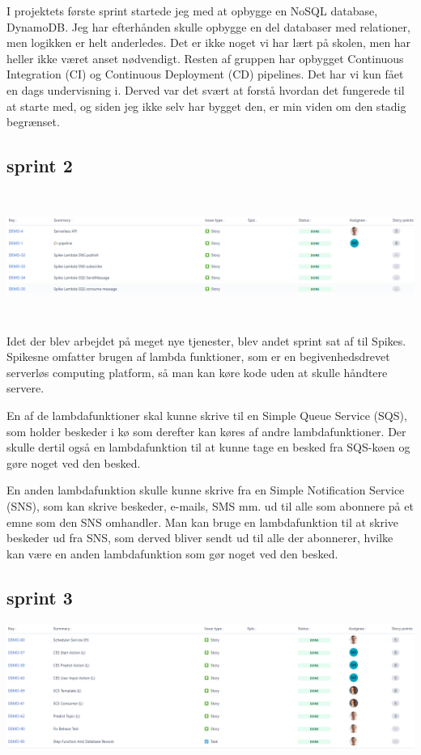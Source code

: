 \documentclass[11pt]{report}
\begin{document}
I projektets første sprint startede jeg med at opbygge en NoSQL database, DynamoDB. 
Jeg har efterhånden skulle opbygge en del databaser med relationer, men logikken er helt anderledes. 
Det er ikke noget vi har lært på skolen, men har heller ikke været anset nødvendigt. 
Resten af gruppen har opbygget Continuous Integration (CI) og Continuous Deployment (CD) pipelines. 
Det har vi kun fået en dags undervisning i. Derved var det svært at forstå hvordan det fungerede til at starte med, 
og siden jeg ikke selv har bygget den, er min viden om den stadig begrænset.  

\subsection*{sprint 2}
\begin{center} 
\includegraphics[height=4.13cm, width=15.92cm]{sprint2}
\end{center}

Idet der blev arbejdet på meget nye tjenester, blev andet sprint sat af til Spikes. 
Spikesne omfatter brugen af lambda funktioner, som er en begivenhedsdrevet serverløs computing platform, 
så man kan køre kode uden at skulle håndtere servere.

En af de lambdafunktioner skal kunne skrive til en Simple Queue Service (SQS), 
som holder beskeder i kø som derefter kan køres af andre lambdafunktioner. 
Der skulle dertil også en lambdafunktion til at kunne tage en besked fra SQS-køen og gøre noget ved den besked.

En anden lambdafunktion skulle kunne skrive fra en Simple Notification Service (SNS), 
som kan skrive beskeder, e-mails, SMS mm. ud til alle som abonnere på et emne som den SNS omhandler. 
Man kan bruge en lambdafunktion til at skrive beskeder ud fra SNS, som derved bliver sendt ud til alle der abonnerer, 
hvilke kan være en anden lambdafunktion som gør noget ved den besked. 


\subsection*{sprint 3}
\begin{center} 
\includegraphics[height=4.13cm, width=15.92cm]{sprint3}
\end{center}
\end{document}
